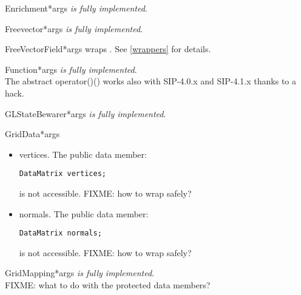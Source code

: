 \documentclass{manual}
\begin{document}
\begin{classdesc}{Enrichment}{*args}
\emph{is fully implemented}.
\end{classdesc}

\begin{classdesc}{Freevector}{*args}
\emph{is fully implemented}.
\end{classdesc}

\begin{classdesc}{FreeVectorField}{*args}
wraps . See \ref{wrappers} for details.
\end{classdesc}

\begin{classdesc}{Function}{*args}
\emph{is fully implemented}.\\
The abstract operator()() works also with SIP-4.0.x and SIP-4.1.x thanks to
a hack.
\end{classdesc}

\begin{classdesc}{GLStateBewarer}{*args}
\emph{is fully implemented}.
\end{classdesc}

\begin{classdesc}{GridData}{*args}
  \begin{itemize}
  \item{vertices}. The public data member:
\begin{verbatim}
DataMatrix vertices;
\end{verbatim}
    is not accessible. FIXME: how to wrap  safely?
  \item{normals}. The public data member:
\begin{verbatim}
DataMatrix normals;
\end{verbatim}
    is not accessible. FIXME: how to wrap  safely?
  \end{itemize}
\end{classdesc}

\begin{classdesc}{GridMapping}{*args}
\emph{is fully implemented}.\\
FIXME: what to do with the protected data members?
\end{classdesc}
\end{document}
